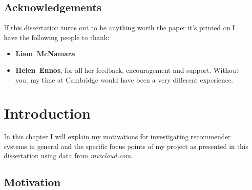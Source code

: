 \documentclass[a4paper,12pt,twoside,notitlepage]{report}
\def\mixurl{\emph{mixcloud.com}}
\begin{document}
\medskip
{}


\newpage


\section*{Acknowledgements}

If this dissertation turns out to be anything worth the paper it's printed on I
have the following people to thank:

\begin{itemize}
 \item {\bf Liam~McNamara}
 \item {\bf Helen~Ennos}, for all her feedback, encouragement and support.
Without you, my time at Cambridge would have been a very different experience. 
\end{itemize}

\clearpage

\tableofcontents
\clearpage






\setcounter{page}{1}
\setcounter{chapter}{0}
\pagestyle{headings}


\chapter{Introduction}


In this chapter I will explain my motivations for investigating recommender
systems in general and the specific focus points of my project as
presented in this dissertation using data from \mixurl.

\section{Motivation}
\end{document}
